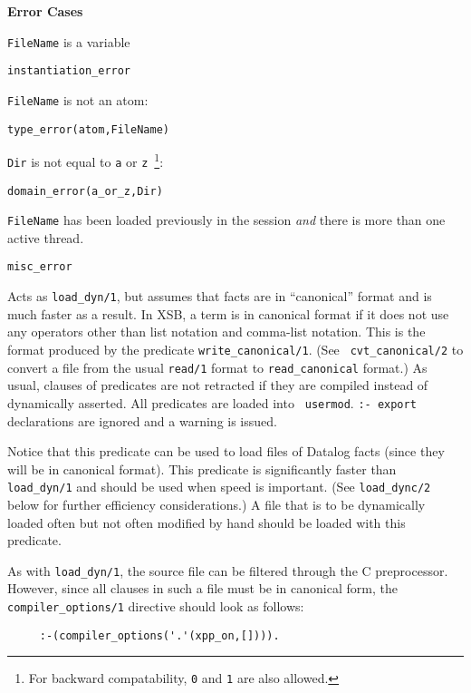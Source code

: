 \begin{description}
{\bf Error Cases}
\bi
\item 	{\tt FileName} is a variable
\bi
\item 	{\tt instantiation\_error}
\ei
\item 	{\tt FileName} is not an atom:
\bi
\item 	{\tt type\_error(atom,FileName)}
\ei
%
\item 	{\tt Dir} is not equal to {\tt a} or {\tt z}~\footnote{For
backward compatability, {\tt 0} and {\tt 1} are also allowed.}: 
\bi
\item 	{\tt domain\_error(a\_or\_z,Dir)}
\ei
%
\item {\tt FileName} has been loaded previously in the session {\em and}
  there is more than one active thread.  
\bi
\item 	{\tt misc\_error}
\ei
\ei

    Acts as {\tt load\_dyn/1}, but assumes that facts are in
    ``canonical'' format and is much faster as a result.  In XSB, a
    term is in canonical format if it does not use any operators other
    than list notation and comma-list notation.  This is the format
    produced by the predicate {\tt write\_canonical/1}. (See {\tt
    cvt\_canonical/2} to convert a file from the usual {\tt read/1}
    format to {\tt read\_canonical} format.)  As usual, clauses of
    predicates are not retracted if they are compiled instead of
    dynamically asserted. All predicates are loaded into {\tt
    usermod}.  {\tt :- export} declarations are ignored and a warning
    is issued.

    Notice that this predicate can be used to load files of Datalog
    facts (since they will be in canonical format).  This predicate is
    significantly faster than {\tt load\_dyn/1} and should be used
    when speed is important.  (See {\tt load\_dync/2} below for
    further efficiency considerations.)  A file that is to be
    dynamically loaded often but not often modified by hand should be
    loaded with this predicate. 

    As with \verb|load_dyn/1|, the source file can be filtered through the C
    preprocessor. However, since all clauses in such a file must be in
    canonical form, the \verb|compiler_options/1| directive should look as
    follows:
    \begin{verbatim}
     :-(compiler_options('.'(xpp_on,[]))).      
    \end{verbatim}


\end{description}
